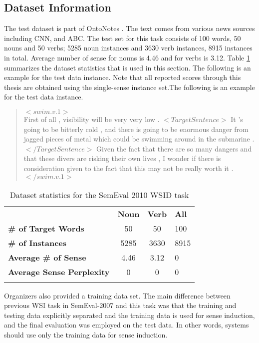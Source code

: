 \subsection{Dataset Information} 
The test dataset is part of OntoNotes \cite{hovy06ontonotes}. The text comes from various news sources including CNN, and ABC. The test set for this task consists of 100 words, 50 nouns and 50 verbs; 5285 noun instances and 3630 verb instances, 8915 instances in total. Average number of sense for nouns is 4.46 and for verbs is 3.12. Table \ref{table:semeval10-dataset} summarizes the dataset statistics that is used in this section. The following is an example for the test data instance. Note that all reported scores through this thesis are obtained using the single-sense instance set.The following is an example for the test data instance.

\begin{quote}
  $<swim.v.1>$ \\
 First of all , visibility will be very very low . $<TargetSentence>$ It 
 's going to be bitterly cold , and there is going to be enormous 
 danger from jagged pieces of metal which could be swimming around in
 the submarine . $</TargetSentence>$ Given the fact that there are so many
 dangers and that these divers are risking their own lives , I wonder
 if there is consideration given to the fact that this may not be 
 really worth it . \\
 $</swim.v.1>$
\end{quote}

\begin{table}
\begin{center}
    \begin{tabular}{ l | c | c | l }  \Xhline{2\arrayrulewidth}  
     & \bf Noun & \bf Verb & \bf All \\  \Xhline{2\arrayrulewidth}  
    \bf \# of Target Words & 50 & 50  & 100 \\ 
    \bf \# of Instances & 5285 & 3630 & 8915 \\ 
    \bf Average \# of Sense & 4.46 & 3.12 & 0 \\ 
    \bf Average Sense Perplexity & 0 & 0 & 0 \\  \Xhline{2\arrayrulewidth}  
    \end{tabular}
\end{center}
    \caption{\label{table:semeval10-dataset} Dataset statistics for the SemEval 2010 WSID task}
\end{table}

Organizers also provided a training data set. The main difference between previous WSI task in SemEval-2007 and this task was that the training and testing data explicitly separated and the training data is used for sense induction, and the final evaluation was employed on the test data. In other words, systems should use only the training data for sense induction. \\

